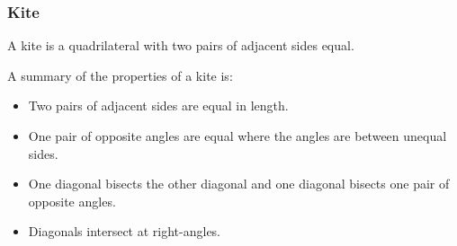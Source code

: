 \subsubsection{ Kite}
A kite is a quadrilateral with two pairs of adjacent sides equal.\par 
A summary of the properties of a kite is:\par 
\begin{itemize}[noitemsep]
\item Two pairs of adjacent sides are equal in length.
\item One pair of opposite angles are equal where the angles are between unequal sides.
\item One diagonal bisects the other diagonal and one diagonal bisects one pair of opposite angles.
\item Diagonals intersect at right-angles.
\end{itemize}
\setcounter{subfigure}{0}
